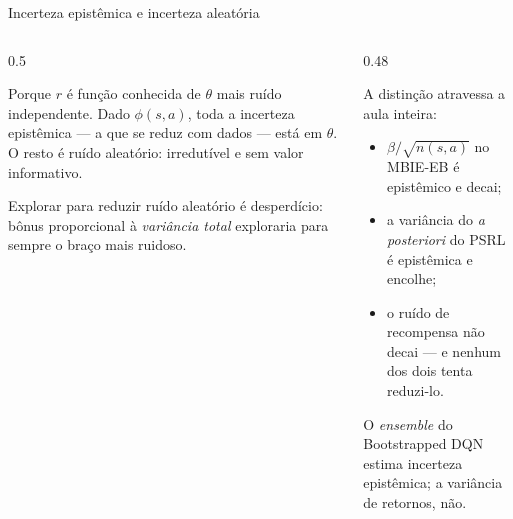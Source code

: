 \documentclass[aspectratio=169, 11pt]{beamer}
\newcommand{\feat}{\phi}
\begin{document}
\begin{frame}{Incerteza epistêmica e incerteza aleatória}
  \begin{columns}[T]
    \begin{column}{0.5\textwidth}
      \begin{respbox}
        Porque $r$ é função conhecida de $\theta$ mais ruído independente. Dado
        $\feat(s,a)$, toda a incerteza \alert{epistêmica} --- a que se reduz com dados
        --- está em $\theta$. O resto é ruído \alert{aleatório}: irredutível e sem valor
        informativo.
      \end{respbox}
      \begin{alertabox}
        Explorar para reduzir ruído aleatório é desperdício: bônus proporcional à
        \emph{variância total} exploraria para sempre o braço mais ruidoso.
      \end{alertabox}
    \end{column}
    \begin{column}{0.48\textwidth}
      \begin{ideiabox}
        A distinção atravessa a aula inteira:
        \begin{itemize}
          \item $\beta/\sqrt{n(s,a)}$ no MBIE-EB é epistêmico e decai;
          \item a variância do \textit{a posteriori} do PSRL é epistêmica e encolhe;
          \item o ruído de recompensa não decai --- e nenhum dos dois tenta reduzi-lo.
        \end{itemize}
      \end{ideiabox}
      {\small\color{rlCinza} O \textit{ensemble} do Bootstrapped DQN estima incerteza
      epistêmica; a variância de retornos, não.}
    \end{column}
  \end{columns}
\end{frame}
\end{document}
